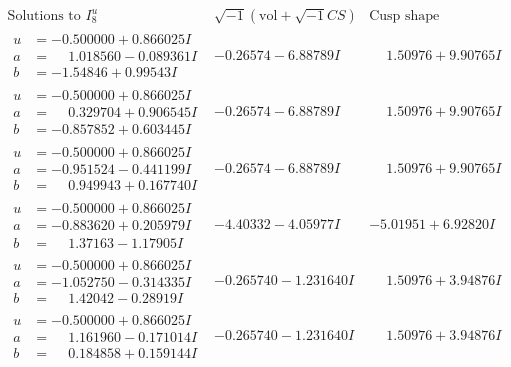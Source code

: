 \documentclass[1p]{elsarticle_modified}
\theoremstyle{definition}
\newcommand{\I}{\sqrt{-1}}
\begin{document}
$$\begin{array}{c|c|c}  
\text{Solutions to }I^u_{8}& \I (\text{vol} + \sqrt{-1}CS) & \text{Cusp shape}\\
 \hline 
\begin{aligned}
u &= -0.500000 + 0.866025 I \\
a &= \phantom{-}1.018560 - 0.089361 I \\
b &= -1.54846 + 0.99543 I\end{aligned}
 & -0.26574 - 6.88789 I & \phantom{-}1.50976 + 9.90765 I \\ \hline\begin{aligned}
u &= -0.500000 + 0.866025 I \\
a &= \phantom{-}0.329704 + 0.906545 I \\
b &= -0.857852 + 0.603445 I\end{aligned}
 & -0.26574 - 6.88789 I & \phantom{-}1.50976 + 9.90765 I \\ \hline\begin{aligned}
u &= -0.500000 + 0.866025 I \\
a &= -0.951524 - 0.441199 I \\
b &= \phantom{-}0.949943 + 0.167740 I\end{aligned}
 & -0.26574 - 6.88789 I & \phantom{-}1.50976 + 9.90765 I \\ \hline\begin{aligned}
u &= -0.500000 + 0.866025 I \\
a &= -0.883620 + 0.205979 I \\
b &= \phantom{-}1.37163 - 1.17905 I\end{aligned}
 & -4.40332 - 4.05977 I & -5.01951 + 6.92820 I \\ \hline\begin{aligned}
u &= -0.500000 + 0.866025 I \\
a &= -1.052750 - 0.314335 I \\
b &= \phantom{-}1.42042 - 0.28919 I\end{aligned}
 & -0.265740 - 1.231640 I & \phantom{-}1.50976 + 3.94876 I \\ \hline\begin{aligned}
u &= -0.500000 + 0.866025 I \\
a &= \phantom{-}1.161960 - 0.171014 I \\
b &= \phantom{-}0.184858 + 0.159144 I\end{aligned}
 & -0.265740 - 1.231640 I & \phantom{-}1.50976 + 3.94876 I \\ \hline\begin{aligned}

\end{aligned}
\end{array}$$
\end{document}
